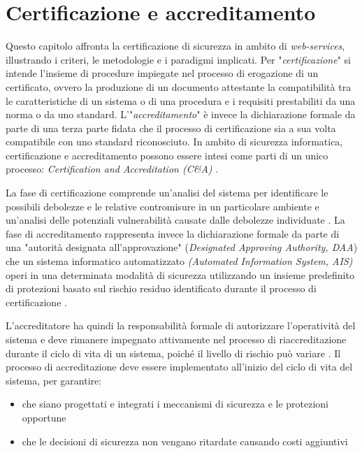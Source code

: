 \documentclass[../main.tex]{subfiles}
\begin{document}
\chapter{Certificazione e accreditamento}
Questo capitolo affronta la certificazione di sicurezza in ambito di \textit{web-services}, illustrando i criteri, le metodologie e i paradigmi implicati.
Per "\textit{certificazione}" si intende l'insieme di procedure impiegate nel processo di erogazione di un certificato, ovvero la produzione di un documento attestante la compatibilità tra le caratteristiche di un sistema o di una procedura e i requisiti prestabiliti da una norma o da uno standard.
L'"\textit{accreditamento}" è invece la dichiarazione formale da parte di una terza parte fidata che il processo di certificazione sia a sua volta compatibile con uno standard riconosciuto.
In ambito di sicurezza informatica, certificazione e accreditamento possono essere intesi come parti di un unico processo: \textit{Certification and Accreditation (C\&A)} \cite{NistCAHandbook}.

La fase di certificazione comprende un'analisi del sistema per identificare le possibili debolezze e le relative contromisure in un particolare ambiente e un'analisi delle potenziali vulnerabilità causate dalle debolezze individuate \cite{NistCAHandbook}.
La fase di accreditamento rappresenta invece la dichiarazione formale da parte di una "autorità designata all'approvazione" (\textit{Designated Approving Authority, DAA}) che un sistema informatico  automatizzato \textit{(Automated Information System, AIS)} operi in una determinata modalità di sicurezza utilizzando un insieme predefinito di protezioni basato sul rischio residuo identificato durante il processo di certificazione \cite{NistCAHandbook}.

L'accreditatore ha quindi la responsabilità formale di autorizzare l'operatività del sistema e deve rimanere impegnato attivamente nel processo di riaccreditazione durante il ciclo di vita di un sistema, poiché il livello di rischio può variare \cite{NistCAHandbook}.
Il processo di accreditazione deve essere implementato all'inizio del ciclo di vita del sistema, per garantire:
\begin{itemize}
\item che siano progettati e integrati i meccanismi di sicurezza e le protezioni opportune
\item che le decisioni di sicurezza non vengano ritardate causando costi aggiuntivi
\end{itemize}
\end{document}
